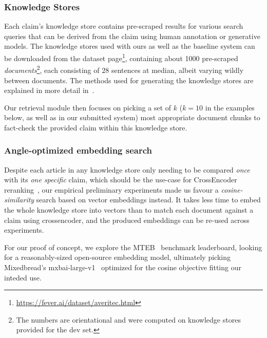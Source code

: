 \subsubsection{Knowledge Stores}
Each claim's knowledge store contains pre-scraped results for various search queries that can be derived from the claim using human annotation or generative models.
The knowledge stores used with ours as well as the baseline system can be downloaded from the \averitec{}  dataset page\footnote{\url{https://fever.ai/dataset/averitec.html}}, containing about 1000 pre-scraped \textit{documents}\footnote{\label{devsetnote} The numbers are orientational and were computed on knowledge stores provided for the \averitec{}  dev set.}, each consisting of $28$ sentences at median, albeit varying wildly between documents.
The methods used for generating the knowledge stores are explained in more detail in~\cite{averitec2024}.

Our retrieval module then focuses on picking a set of $k$ ($k=10$ in the examples below, as well as in our submitted system) most appropriate document chunks to fact-check the provided claim within this knowledge store.

\subsubsection{Angle-optimized embedding search}
\label{sec:knn}
Despite each article in any knowledge store only needing to be compared \textit{once} with its \textit{one specific} claim, which should be the use-case for CrossEncoder reranking~\cite{dejean2024thoroughcomparisoncrossencodersllms}, our empirical preliminary experiments made us favour a \textit{cosine-similarity} search based on vector embeddings instead.
It takes less time to embed the whole knowledge store into vectors than to match each document against a claim using crossencoder, and the produced embeddings can be re-used across experiments.

For our proof of concept, we explore the MTEB~\cite{muennighoff-etal-2023-mteb} benchmark leaderboard, looking for a reasonably-sized open-source embedding model, ultimately picking Mixedbread's mxbai-large-v1~\cite{li-li-2024-aoe,emb2024mxbai} optimized for the cosine objective fitting our inteded use.

